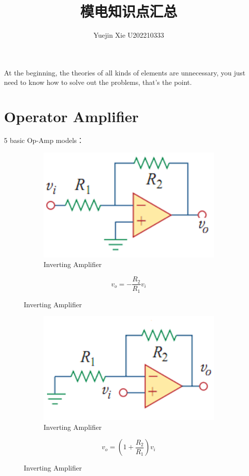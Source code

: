 \documentclass[a4paper,11pt,UTF8]{article}
\title{模电知识点汇总}
\author{Yuejin Xie \quad U202210333}
\date{}
\begin{document}
\maketitle
At the beginning, the theories of all kinds of elements are unnecessary, you just need to know how to solve out the problems, that's the point.
\section{Operator Amplifier}
5 basic Op-Amp models：

\begin{figure}[H]
	\begin{minipage}{.69\textwidth}
		\begin{figure}[H] 
			\centering 
			\includegraphics[scale=0.5]{./img/9.1.png}
			\caption{Inverting Amplifier}
		\end{figure}
	\end{minipage}
	\begin{minipage}{.29\textwidth}
		\LARGE{$$
			v_o=-\frac{R_2}{R_1}v_i
			$$}
	\end{minipage}
\end{figure}

\begin{figure}[H]
	\begin{minipage}{.5\textwidth}
		\begin{figure}[H] 
			\centering 
			\includegraphics[scale=0.5]{./img/9.2.png}
			\caption{Inverting Amplifier}
		\end{figure}
	\end{minipage}
	\begin{minipage}{.5\textwidth}
		\LARGE{$$
			v_o=(1+\frac{R_2}{R_1})v_i
			$$}
	\end{minipage}
\end{figure}
\end{document}
